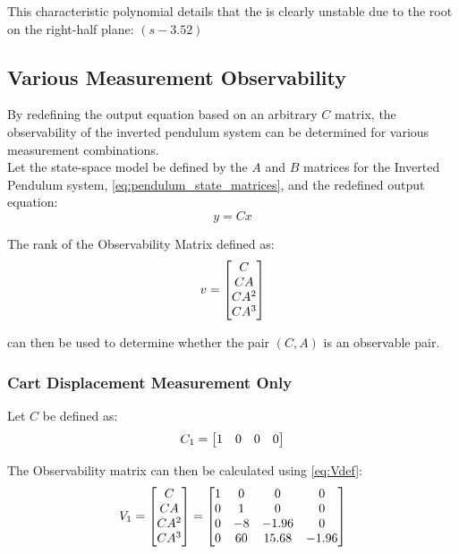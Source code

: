 \documentclass[]{article}
\begin{document}
			This characteristic polynomial details that the is clearly unstable due to the root on the right-half plane: $(s-3.52)$

	\subsection{Various Measurement Observability}
		By redefining the output equation based on an arbitrary $C$ matrix, the observability of the inverted pendulum system can be determined for various measurement combinations.\\
		
		Let the state-space model be defined by the $A$ and $B$ matrices for the Inverted Pendulum system, \eqref{eq:pendulum_state_matrices}, and the redefined output equation:
		\begin{equation}
			y = C x \label{eq:generalOutputdef}
		\end{equation}
		
		The rank of the Observability Matrix defined as:
		\begin{equation}
			v = \mqty[C\\ CA\\ CA^2\\ CA^3] \label{eq:Vdef}
		\end{equation}
		
		can then be used to determine whether the pair $(C, A)$ is an observable pair.
		
		\subsubsection{Cart Displacement Measurement Only}
			
			Let $C$ be defined as:
			\begin{equation}
				C_1 = \mqty[1	&0	&0	&0]
			\end{equation}
		
			The Observability matrix can then be calculated using \eqref{eq:Vdef}:
			\begin{equation}
				V_1 = \mqty[C\\ CA\\ CA^2\\ CA^3]
					= \mqty[1	&0	&0		&0\\
							0	&1	&0		&0\\
							0	&-8	&-1.96	&0\\
							0	&60	&15.68	&-1.96] \label{eq:v1def}
			\end{equation}
		
\end{document}
